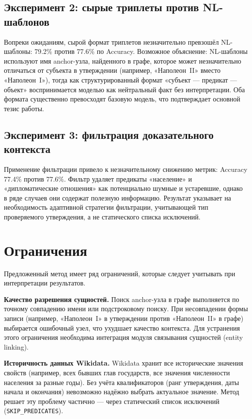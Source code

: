 \documentclass{misisarticle}
\begin{document}
\subsection{Эксперимент 2: сырые триплеты против NL-шаблонов}

Вопреки ожиданиям, сырой формат триплетов
незначительно превзошёл NL-шаблоны:
79.2\% против 77.6\% по Accuracy.
Возможное объяснение: NL-шаблоны используют
имя anchor-узла, найденного в графе,
которое может незначительно отличаться
от субъекта в утверждении
(например, «Наполеон~II» вместо «Наполеон~I»),
тогда как структурированный формат
«субъект — предикат — объект» воспринимается
моделью как нейтральный факт без интерпретации.
Оба формата существенно превосходят базовую модель,
что подтверждает основной тезис работы.

\subsection{Эксперимент 3: фильтрация доказательного контекста}

Применение фильтрации привело к незначительному
снижению метрик: Accuracy 77.4\% против 77.6\%.
Фильтр удаляет предикаты «население» и
«дипломатические отношения» как потенциально
шумные и устаревшие, однако в ряде случаев
они содержат полезную информацию.
Результат указывает на необходимость
адаптивной стратегии фильтрации,
учитывающей тип проверяемого утверждения,
а не статического списка исключений.

\section{Ограничения}

Предложенный метод имеет ряд ограничений,
которые следует учитывать при интерпретации результатов.

\textbf{Качество разрешения сущностей.}
Поиск anchor-узла в графе выполняется по точному
совпадению имени или подстроковому поиску.
При несовпадении формы записи (например,
«Наполеон~I» в утверждении против «Наполеон~II»
в графе) выбирается ошибочный узел,
что ухудшает качество контекста.
Для устранения этого ограничения необходима
интеграция модуля связывания сущностей (entity linking).

\textbf{Историчность данных Wikidata.}
Wikidata хранит все исторические значения свойств
(например, всех бывших глав государств,
все значения численности населения за разные годы).
Без учёта квалификаторов (ранг утверждения,
даты начала и окончания) невозможно надёжно
выбрать актуальное значение.
Метод решает эту проблему частично —
через статический список исключений (\texttt{SKIP\_PREDICATES}).
\end{document}

